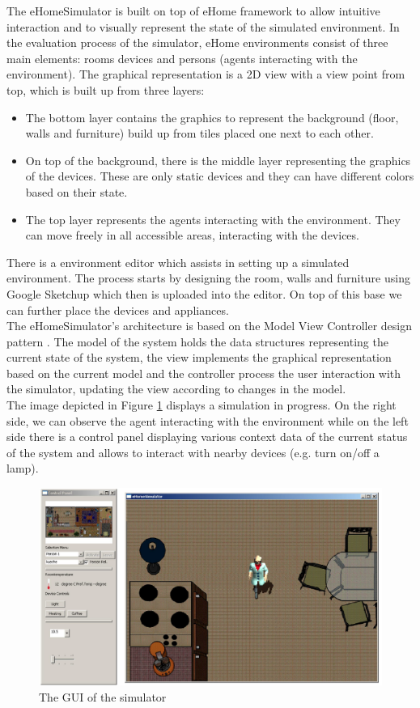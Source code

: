The eHomeSimulator is built on top of eHome framework to allow intuitive interaction and to visually represent the state of the simulated environment. In the evaluation process of the simulator, eHome environments consist of three main elements: rooms devices and persons (agents interacting with the environment). The graphical representation is a 2D view with a view point from top, which is built up from three layers:
\begin{itemize}
	\item The bottom layer contains the graphics to represent the background (floor, walls and furniture) build up from tiles placed one next to each other.
	\item On top of the background, there is the middle layer representing the graphics of the devices. These are only static devices and they can have different colors based on their state.
	\item The top layer represents the agents interacting with the environment. They can move freely in all accessible areas, interacting with the devices.
\end{itemize}

There is a environment editor which assists in setting up a simulated environment. The process starts by designing the room, walls and furniture using Google Sketchup \cite{sketchup:online} which then is uploaded into the editor. On top of this base we can further place the devices and appliances.\\

The eHomeSimulator's architecture is based on the Model View Controller design pattern \cite{erich1995design}. The model of the system holds the data structures representing the current state of the system, the view implements the graphical representation based on the current model and the controller process the user interaction with the simulator, updating the view according to changes in the model.\\

The image depicted in Figure \ref{fig:simulated_env} displays a simulation in progress. On the right side, we can observe the agent interacting with the environment while on the left side there is a control panel displaying various context data of the current status of the system and allows to interact with nearby devices (e.g. turn on/off a lamp).

\begin{figure}[H]
	\centering
	\includegraphics[width=\linewidth]{gfx/Chapter2/simulated_env}
	\caption{The GUI of the simulator}
	\label{fig:simulated_env}
\end{figure}
